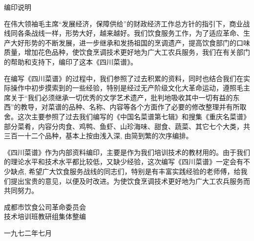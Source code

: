 \begin{center}
\Large
编印说明
\end{center}

在伟大领袖毛主席{\sffamily“发展经济，保障供给”}的财政经济工作总方针的指引下，商业战线同各条战线一样，形势大好，越来越好。我们饮食服务工作，为了适应革命、生产大好形势的不断发展，进一步继承和发扬祖国的烹调遗产，提高饮食部门的口味质量，增加花色品种，使饮食烹调技术更好地为广大工农兵服务，我们在有关部门的帮助和支持下，编印了这本《四川菜谱》。

在编写《四川菜谱》的过程中，我们参照了过去积累的资料，同时也结合我们在实际操作中初步摸索到的一些经验，特别是经过无产阶级文化大革命运动，遵照毛主席关于{\sffamily“我们必须继承一切优秀的文学艺术遗产，批判地吸收其中一切有益的东西”}的教导，对菜谱的品种、名称、内容等各个方面作了必要的修改整理并有所取舍。这次主要参照了过去我们编写的《中国名菜谱第七辑》和搜集《重庆名菜谱》部分菜肴，内容分肉食、鸡鸭、鱼虾、山珍海味、甜食、蔬菜、其它七个大类，共三百一十二个品种，基本上按由浅入深, 由简到繁的次序编排。

《四川菜谱》作为内部资料编印，主要是作为我们培训技术的教材用的。由于我们的理论水平和技术水平都比较低，又缺少经验，这次编写《四川菜谱》一定会有不少缺点, 希望广大饮食服务战线的同志们，特别是有丰富实践经验的老师傅，给我们提出宝贵的意见，以便及时改进。为使饮食烹调技术更好地为广大工农兵服务而共同努力。

\begin{flushright}
成都市饮食公司革命委员会\\
技术培训班教研组集体整编

一九七二年七月
\end{flushright}

